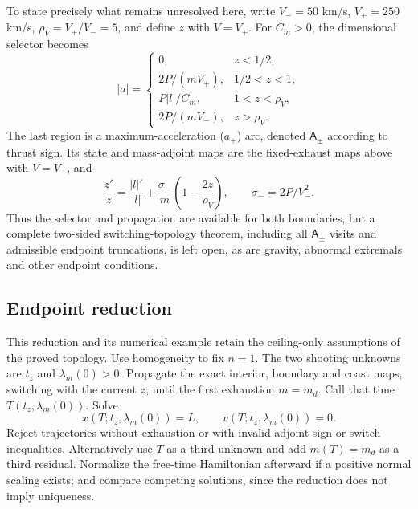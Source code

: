 To state precisely what remains unresolved here, write $V_-=50$ km/s,
$V_+=250$ km/s, $\rho_V=V_+/V_-=5$, and define $z$ with $V=V_+$.
For $C_m>0$, the dimensional selector becomes
\begin{equation}
 |a|=\begin{cases}
 0,&z<1/2,\\
 2P/(mV_+),&1/2<z<1,\\
 P|l|/C_m,&1<z<\rho_V,\\
 2P/(mV_-),&z>\rho_V.
 \end{cases}
\end{equation}
The last region is a maximum-acceleration ($a_+$) arc, denoted
$\mathsf A_\pm$ according to thrust sign. Its state and mass-adjoint
maps are the fixed-exhaust maps above with $V=V_-$, and
\begin{equation}
 \frac{z'}z=\frac{|l|'}{|l|}
   +\frac{\sigma_-}{m}\left(1-\frac{2z}{\rho_V}\right),
 \qquad\sigma_-=2P/V_-^2.
\end{equation}
Thus the selector and propagation are available for both boundaries,
but a complete two-sided switching-topology theorem, including all
$\mathsf A_\pm$ visits and admissible endpoint truncations, is left open,
as are gravity, abnormal extremals and other endpoint conditions.

\subsection{Endpoint reduction}
This reduction and its numerical example retain the ceiling-only
assumptions of the proved topology.
Use homogeneity to fix $n=1$. The two shooting unknowns are $t_z$ and
$\lambda_m(0)>0$. Propagate the exact interior, boundary and coast maps,
switching with the current $z$, until the first exhaustion $m=m_d$.
Call that time $T(t_z,\lambda_m(0))$. Solve
\begin{equation}
 x(T;t_z,\lambda_m(0))=L,\qquad
 v(T;t_z,\lambda_m(0))=0.
\end{equation}
Reject trajectories without exhaustion or with invalid adjoint sign or
switch inequalities. Alternatively use $T$ as a third unknown and add
$m(T)=m_d$ as a third residual. Normalize the free-time Hamiltonian
afterward if a positive normal scaling exists; and compare competing
solutions, since the reduction does not imply uniqueness.


